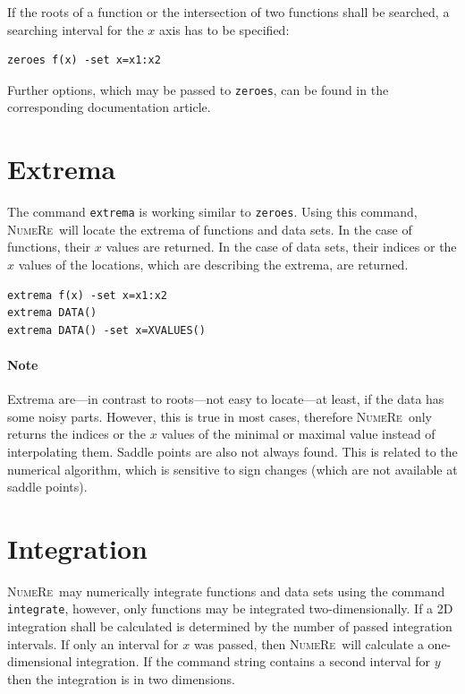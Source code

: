 \documentclass[DIV=14,headsepline,footsepline]{scrbook}
\newcommand{\NR}{\textsc{Nu\-me\-Re}}
\begin{document}
				If the roots of a function or the intersection of two functions shall be searched, a searching interval for the $x$ axis has to be specified:
				\begin{lstlisting}
zeroes f(x) -set x=x1:x2
				\end{lstlisting}
				
				Further options, which may be passed to \verb+zeroes+, can be found in the corresponding documentation article.
				
			\section{Extrema}
				The command \verb+extrema+ is working similar to \verb+zeroes+. Using this command, \NR\ will locate the extrema of functions and data sets. In the case of functions, their $x$ values are returned. In the case of data sets, their indices or the $x$ values of the locations, which are describing the extrema, are returned.
				\begin{lstlisting}
extrema f(x) -set x=x1:x2
extrema DATA()
extrema DATA() -set x=XVALUES()
				\end{lstlisting}
				\paragraph{Note} Extrema are---in contrast to roots---not easy to locate---at least, if the data has some noisy parts. However, this is true in most cases, therefore \NR\ only returns the indices or the $x$ values of the minimal or maximal value instead of interpolating them. Saddle points are also not always found. This is related to the numerical algorithm, which is sensitive to sign changes (which are not available at saddle points).
				
			\section{Integration}
				\NR\ may numerically integrate functions and data sets using the command \verb+integrate+, however, only functions may be integrated two-dimensionally. If a 2D integration shall be calculated is determined by the number of passed integration intervals. If only an interval for $x$ was passed, then \NR\ will calculate a one-dimensional integration. If the command string contains a second interval for $y$ then the integration is in two dimensions.
				
\end{document}
